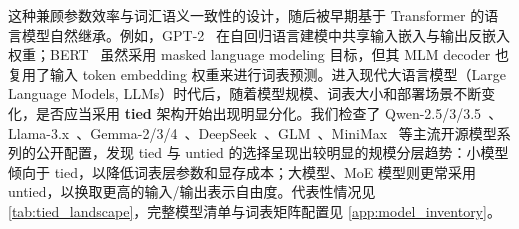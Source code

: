 \documentclass{article}
\theoremstyle{plain}
\theoremstyle{definition}
\theoremstyle{remark}
\begin{document}
\begin{table}[!ht]
\centering
\caption{\textbf{主流模型的 tied/untied 现状} 表中概括 Qwen-2.5/3/3.5、Llama-3.x、Gemma-2/3/4、DeepSeek、GLM、MiniMax 等主流开源模型系列。整体上，tied/untied 选择呈现出规模分层趋势，但不同模型族之间仍存在显著差异，并无完全统一的方案}
\label{tab:tied_landscape}
\begin{small}
\setlength{\tabcolsep}{3pt}
\end{small}
\vskip -0.1in
\end{table}

这种兼顾参数效率与词汇语义一致性的设计，随后被早期基于 Transformer 的语言模型自然继承。例如，GPT-2~\cite{radford2019language} 在自回归语言建模中共享输入嵌入与输出反嵌入权重；BERT~\cite{devlin2019bert} 虽然采用 masked language modeling 目标，但其 MLM decoder 也复用了输入 token embedding 权重来进行词表预测。进入现代大语言模型（Large Language Models, LLMs）时代后，随着模型规模、词表大小和部署场景不断变化，是否应当采用 \textbf{tied} 架构开始出现明显分化。我们检查了 Qwen-2.5/3/3.5~\cite{qwen2025qwen25,yang2025qwen3,qwen2026qwen35}、Llama-3.x~\cite{llama2024llama3}、Gemma-2/3/4~\cite{gemma2024gemma2,gemma2025gemma3,google2026gemma4}、DeepSeek~\cite{deepseek2024v2,deepseek2024v3,deepseek2025r1,deepseek2026v4}、GLM~\cite{glm5team2026glm5,zai2026glm51}、MiniMax~\cite{minimax2026m25,minimax2026m27} 等主流开源模型系列的公开配置，发现 tied 与 untied 的选择呈现出较明显的规模分层趋势：小模型倾向于 tied，以降低词表层参数和显存成本；大模型、MoE 模型则更常采用 untied，以换取更高的输入/输出表示自由度。代表性情况见 \cref{tab:tied_landscape}，完整模型清单与词表矩阵配置见 \cref{app:model_inventory}。
\end{document}
